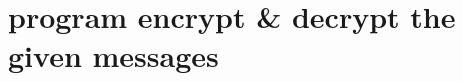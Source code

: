 \hypertarget{index_This}{}\section{program encrypt \& decrypt the given messages}\label{index_This}
